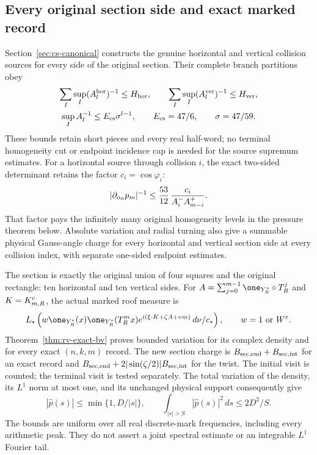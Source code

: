 \subsection*{Every original section side and exact marked record}
Section~\ref{sec:cs-canonical} constructs the genuine horizontal
and vertical collision sources for every side of the original
section. Their complete branch partitions obey
\begin{gather*}
 \sum_I\sup_I(A_l^{\rm hor})^{-1}\le H_{\rm hor},\qquad
 \sum_I\sup_I(A_l^{\rm ver})^{-1}\le H_{\rm ver},\\
 \sup_I A_l^{-1}\le E_{\rm cs}\sigma^{l-1},
 \qquad E_{\rm cs}=47/6,\qquad\sigma=47/59.
\end{gather*}
These bounds retain short pieces and every real half-word; no
terminal homogeneity cut or endpoint incidence cap is needed for
the source supremum estimates. For a horizontal source through
collision $i$, the exact two-sided determinant retains the factor
$c_i=\cos\varphi_i$:
\[
 |\partial_{\alpha_0}p_m|^{-1}
 \le {53\over12}\,{c_i\over A_i^-A_{m-i}^+}.
\]
That factor pays the infinitely many original homogeneity levels
in the pressure theorem below. Absolute variation and radial
turning also give a summable physical Gauss-angle charge for
every horizontal and vertical section side at every collision
index, with separate one-sided endpoint estimates.

The section is exactly the original union of four squares and
the original rectangle: ten horizontal and ten vertical sides.
For $A=\sum_{j=0}^{m-1}\one_{Y_R^*}\circ T_R^j$ and
$K=K^{\rm c}_{m,R}$, the actual marked roof measure is
\[
 L_*\left(w\one_{Y_R^*}(x)\one_{Y_R^*}(T_R^mx)
      e^{i(\xi\cdot K+\zeta A+\upsilon m)}\,d\nu/c_*\right),
 \qquad w=1\ \hbox{or}\ W^\varepsilon.
\]
Theorem~\ref{thm:rv-exact-bv} proves bounded variation for its
complex density and for every exact $(n,k,m)$ record. The new
section charge is $B_{\rm sec,end}+B_{\rm sec,int}$ for an exact
record and
$B_{\rm sec,end}+2|\sin(\zeta/2)|B_{\rm sec,int}$ for the twist.
The initial visit is counted; the terminal visit is tested
separately. The total variation of the density, its $L^1$ norm
at most one, and its unchanged physical support consequently give
\begin{equation}\label{eq:intro-fourier}
 |\widehat p(s)|\le\min\{1,D/|s|\},\qquad
 \int_{|s|>S}|\widehat p(s)|^2\,ds\le2D^2/S.
\end{equation}
The bounds are uniform over all real discrete-mark frequencies,
including every arithmetic peak. They do not assert a joint
spectral estimate or an integrable $L^1$ Fourier tail.

